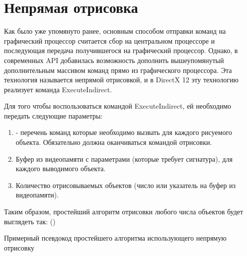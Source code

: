 \section{Непрямая отрисовка} \label{ch3:indirect_draw}
Как было уже упомянуто ранее, основным способом отправки команд на графический процессор считается сбор  на центральном процессоре и последующая передача получившегося  на графический процессор. Однако, в современных API добавилась возможность дополнить вышеупомянутый  дополнительным массивом команд прямо из графического процессора. Эта технология называется непрямой отрисовкой, и в DirectX 12 эту технологию реализует команда ExecuteIndirect. 

Для того чтобы воспользоваться командой ExecuteIndirect, ей необходимо передать следующие параметры:
\begin{enumerate}[1.] 
	\item {} - перечень команд которые необходимо вызвать для каждого рисуемого объекта. Обязательно должна оканчиваться командой отрисовки.
	\item Буфер из видеопамяти с параметрами (которые требует сигнатура), для каждого выводимого объекта.
	\item Количество отрисовываемых объектов (число или указатель на буфер из видеопамяти).
\end{enumerate}

Таким образом, простейший алгоритм отрисовки любого числа объектов будет выглядеть так: ()

\begin{algorithm} %
	\nonl{}
	\caption{Примерный псевдокод простейшего алгоритма использующего непрямую отрисовку}\label{alg:simpleIndirect}
\end{algorithm}
\FloatBarrier

